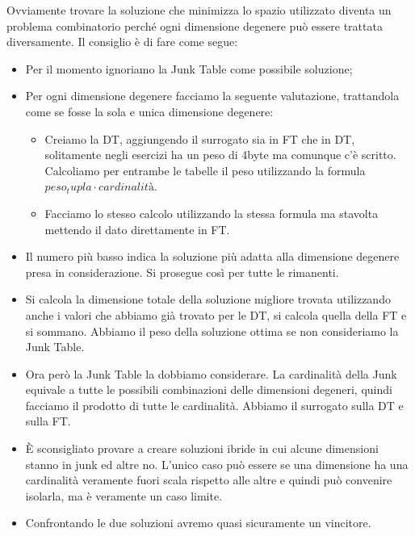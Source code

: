 Ovviamente trovare la soluzione che minimizza lo spazio utilizzato diventa un problema combinatorio perché ogni dimensione degenere può essere trattata diversamente. Il consiglio è di fare come segue:
\begin{itemize}
	\item Per il momento ignoriamo la Junk Table come possibile soluzione;
	\item Per ogni dimensione degenere facciamo la seguente valutazione, trattandola come se fosse la sola e unica dimensione degenere:
	\begin{itemize}
		\item Creiamo la DT, aggiungendo il surrogato sia in FT che in DT, solitamente negli esercizi ha un peso di 4byte ma comunque c'è scritto. Calcoliamo per entrambe le tabelle il peso utilizzando la formula $peso_tupla \cdot cardinalità$.
		\item Facciamo lo stesso calcolo utilizzando la stessa formula ma stavolta mettendo il dato direttamente in FT.
	\end{itemize}
	\item Il numero più basso indica la soluzione più adatta alla dimensione degenere presa in considerazione. Si prosegue così per tutte le rimanenti.
	\item Si calcola la dimensione totale della soluzione migliore trovata utilizzando anche i valori che abbiamo già trovato per le DT, si calcola quella della FT e si sommano. Abbiamo il peso della soluzione ottima se non consideriamo la Junk Table.
	\item Ora però la Junk Table la dobbiamo considerare. La cardinalità della Junk equivale a tutte le possibili combinazioni delle dimensioni degeneri, quindi facciamo il prodotto di tutte le cardinalità. Abbiamo il surrogato sulla DT e sulla FT.
	\item È sconsigliato provare a creare soluzioni ibride in cui alcune dimensioni stanno in junk ed altre no. L'unico caso può essere se una dimensione ha una cardinalità veramente fuori scala rispetto alle altre e quindi può convenire isolarla, ma è veramente un caso limite.
	\item Confrontando le due soluzioni avremo quasi sicuramente un vincitore.
\end{itemize}
\newpage
